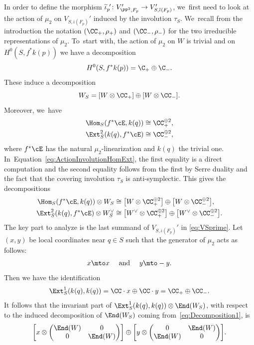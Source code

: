 In order to define the morphism $\widetilde{\iota}_p^{\ \prime}\colon V_{\PP^2,F_p}'\to V_{S,\overline{\iota}(F_p)}'$, we~first need to look at the action of $\mu_2$ on $V_{S,\overline{\iota}(F_p)}'$ induced by the involution $\tau_{S}$. We~recall from the introduction the notation $(\CC_{+},\rho_+)$ and $(\CC_{-},\rho_-)$ for the two irreducible representations of $\mu_2$. To~start with, the action of $\mu_2$ on $W$ is trivial and on $H^0(S,f^*k(p))$ we have a decomposition
\[
H^0(S,f^*k(p)) = \C_+ \oplus \C_-.
\]
These induce a decomposition
\begin{equation}\label{eq:Decomposition1}
W_S=\left[W\otimes \CC_{+}\right] \oplus[W\otimes \CC_{-}].
\end{equation}
Moreover, we~have
\begin{equation}\label{eq:ActionInvolutionHomExt}
\begin{split}
\Hom_{S}(f^*\cE,k(q)) &\cong \CC_{+}^{\oplus 2},\\
\Ext^2_{S}(k(q),f^*\cE) &\cong \CC_{-}^{\oplus 2},
\end{split}
\end{equation}
where $f^*\cE$ has the natural $\mu_2$-linearization and $k(q)$ the trivial one. In~Equation~\eqref{eq:ActionInvolutionHomExt}, the first equality is a direct computation and the second equality follows from the first by Serre duality and the fact that the covering involution $\tau_S$ is anti-symplectic.
This gives the decompositions
\begin{equation}\label{eq:ActionInvolutionHomExtW}
\begin{split}
\Hom_{S}(f^*\cE,k(q))\otimes W_S&\cong \bigl[W\otimes \CC_{+}^{\oplus 2}\bigr] \oplus \bigl[W\otimes \CC_{-}^{\oplus 2}\bigr],\\
\Ext^2_{S}(k(q),f^*\cE)\otimes W_S^\vee&\cong \bigl[W^\vee\otimes \CC_{+}^{\oplus 2}\bigr] \oplus \bigl[W^\vee\otimes \CC_{-}^{\oplus 2}\bigr].
\end{split}
\end{equation}
The key part to analyze is the last summand of $V_{S,\overline{\iota}(F_p)}'$ in \eqref{eq:VSprime}.
Let $(x,y)$ be local coordinates near $q\in S$ such that the generator of $\mu_2$ acts as follows:
\[
x\mto x\quad\text{ and }\quad y\mto -y.
\]
Then we have the identification
\begin{equation*}\label{eq:ExtDecomposition}
\Ext^1_{S}(k(q),k(q)) = \CC\cdot x \oplus \CC\cdot y = \CC_{+} \oplus \CC_{-}.
\end{equation*}
It follows that the invariant part of $\Ext^1_{S}(k(q),k(q))\otimes \End(W_S)$, with respect to the induced decomposition of $\End(W_S)$ coming from~\eqref{eq:Decomposition1}, is
\[
\biggl[x \otimes \begin{pmatrix}\End(W)&0\\0&\End(W)\end{pmatrix}\biggr] \oplus \biggl[y\otimes \begin{pmatrix}0&\End(W)\\\End(W)&0\end{pmatrix}\biggr].
\]

